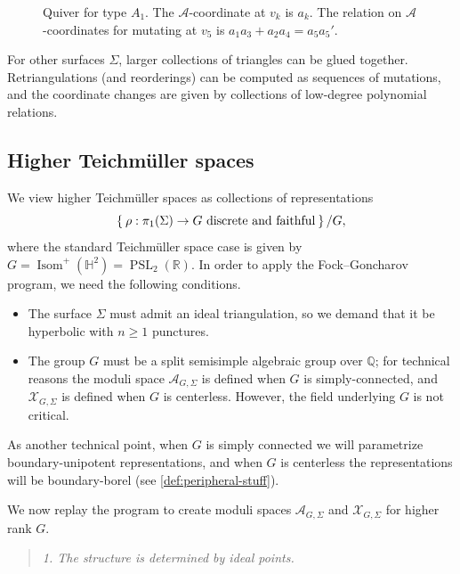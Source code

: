 \documentclass{amsart}
\theoremstyle{plain}
\theoremstyle{definition}
\theoremstyle{remark}
\DeclareMathOperator{\Isom}{Isom}
\DeclareMathOperator{\PSL}{PSL}
\begin{document}
  \begin{figure}[h]
    \centering 

    \caption{Quiver for type $A_1$. The $\mathcal{A}$-coordinate at
      $v_k$ is $a_k$. The relation on $\mathcal{A}$-coordinates for
      mutating at $v_5$ is $a_1 a_3 + a_2 a_4 = a_5 a_5'$.
      \label{fig:QA1-and-flip}
    }
  \end{figure}

  For other surfaces $\Sigma$, larger collections of triangles can be
  glued together. Retriangulations (and reorderings) can be computed as
  sequences of mutations, and the coordinate changes are given by
  collections of low-degree polynomial relations.

  \subsection{Higher Teichmüller spaces}

  We view higher Teichmüller spaces as collections of representations \[
    \Set{ \rho : \pi_1(\Sigma) \to G \text{ discrete and faithful}} / G,
  \] where the standard Teichmüller space case is given by $G =
  \Isom^{+}(\mathbb{H}^2) = \PSL_2(\mathbb{R})$. In order to apply the
  Fock--Goncharov program, we need the following conditions.
  \begin{itemize}
  \item
    The surface $\Sigma$ must admit an ideal triangulation, so we demand
    that it be hyperbolic with $n \ge 1$ punctures.
  \item
    The group $G$ must be a split semisimple algebraic group over
    $\mathbb{Q}$; for technical reasons the moduli space
    $\mathcal{A}_{G,\Sigma}$ is defined when $G$ is simply-connected,
    and $\mathcal{X}_{G,\Sigma}$ is defined when $G$ is centerless.
    However, the field underlying $G$ is not critical.
  \end{itemize}

  As another technical point, when $G$ is simply connected we will
  parametrize boundary-unipotent representations, and when $G$ is
  centerless the representations will be boundary-borel (see
  \cref{def:peripheral-stuff}).

  We now replay the program to create moduli spaces
  $\mathcal{A}_{G,\Sigma}$ and $\mathcal{X}_{G,\Sigma}$ for higher rank
  $G$.

  \begin{quote}
    \emph{1. The structure is determined by ideal points.}
  \end{quote}
\end{document}
